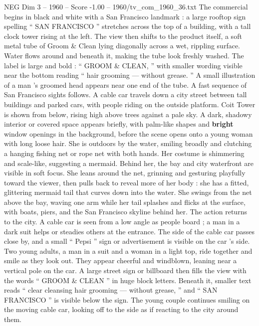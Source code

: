 \begin{textsample}{NEG Dim 3 – 1960 – Score -1.00 – 1960/tv\_com\_1960\_36.txt}  \label{ex:f3_neg_077}
The commercial begins in black and white with a San Francisco landmark : a large rooftop sign spelling “ SAN FRANCISCO ” stretches across the top of a building, with a tall clock tower rising at the left.
The view then shifts to the product itself, a soft metal tube of Groom \& Clean lying diagonally across a wet, rippling surface.
Water flows around and beneath it, making the tube look freshly washed.
The label is large and bold : “ GROOM \& CLEAN, ” with smaller wording visible near the bottom reading “ hair grooming — without grease. ” A small illustration of a man ’s groomed head appears near one end of the tube.
A fast sequence of San Francisco sights follows.
A cable car travels down a city street between tall buildings and parked cars, with people riding on the outside platform.
Coit Tower is shown from below, rising high above trees against a pale sky.
A dark, shadowy interior or covered space appears briefly, with palm-like shapes and \textbf{bright} window openings in the background, before the scene opens onto a young woman with long loose hair.
She is outdoors by the water, smiling broadly and clutching a hanging fishing net or rope net with both hands.
Her costume is shimmering and scale-like, suggesting a mermaid.
Behind her, the bay and city waterfront are visible in soft focus.
She leans around the net, grinning and gesturing playfully toward the viewer, then pulls back to reveal more of her body : she has a fitted, glittering mermaid tail that curves down into the water.
She swings from the net above the bay, waving one arm while her tail splashes and flicks at the surface, with boats, piers, and the San Francisco skyline behind her.
The action returns to the city.
A cable car is seen from a low angle as people board ; a man in a dark suit helps or steadies others at the entrance.
The side of the cable car passes close by, and a small “ Pepsi ” sign or advertisement is visible on the car ’s side.
Two young adults, a man in a suit and a woman in a light top, ride together and smile as they look out.
They appear cheerful and windblown, leaning near a vertical pole on the car.
A large street sign or billboard then fills the view with the words “ GROOM \& CLEAN ” in huge block letters.
Beneath it, smaller text reads “ clear cleansing hair grooming — without grease, ” and “ SAN FRANCISCO ” is visible below the sign.
The young couple continues smiling on the moving cable car, looking off to the side as if reacting to the city around them.

\end{textsample}

